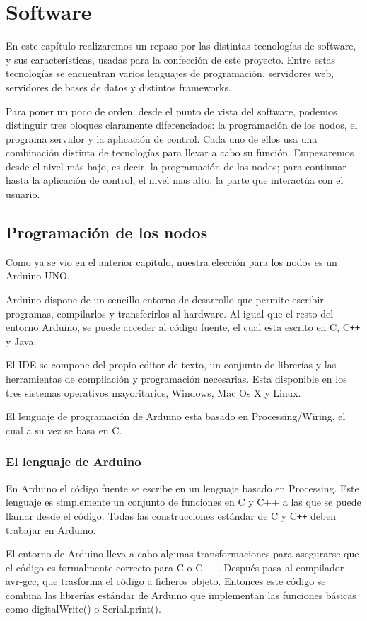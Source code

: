 \chapter{Software}
En este capítulo realizaremos un repaso por las distintas tecnologías de software, y sus características, usadas para la confección de este proyecto. Entre estas tecnologías  se encuentran  varios lenguajes de programación, servidores web, servidores de bases de datos y distintos frameworks.


Para poner un poco de orden, desde el punto de vista del software, podemos distinguir tres bloques claramente diferenciados: la programación de los nodos, el programa servidor y la aplicación de control. Cada uno de ellos usa una combinación distinta de tecnologías para llevar a cabo su función.  Empezaremos desde el nivel más bajo, es decir, la programación de los nodos; para continuar hasta la aplicación de control, el nivel mas alto, la parte que interactúa con el usuario.
 
\section{Programación de los nodos}
Como ya se vio en el anterior capítulo, nuestra elección para los nodos es un Arduino UNO. 

Arduino dispone de un sencillo entorno de desarrollo que permite escribir programas, compilarlos y transferirlos al hardware. Al igual que el resto del entorno  Arduino, se  puede acceder al código fuente, el cual esta escrito en C, C{}\verb!++! y Java.

El IDE se compone del propio editor de texto, un conjunto de librerías y las herramientas de compilación y programación necesarias. Esta disponible en los tres sistemas operativos mayoritarios, Windows, Mac Os X y Linux.

El lenguaje de programación de Arduino esta basado en Processing/Wiring, el cual a su vez se basa en C.

\subsection{El lenguaje de Arduino}
En Arduino  el código fuente se escribe en un lenguaje basado en Processing. Este lenguaje es simplemente un conjunto de funciones en C y C++ a las que se puede llamar desde el código.  Todas las construcciones estándar de C y C{}\verb!++! deben trabajar en Arduino.

El entorno de Arduino lleva a cabo algunas transformaciones para asegurarse que el código es formalmente correcto para C o C++. Después pasa al compilador avr-gcc, que trasforma el código a ficheros objeto. Entonces este código se combina  las librerías estándar de Arduino que implementan las funciones básicas como digitalWrite() o Serial.print().

